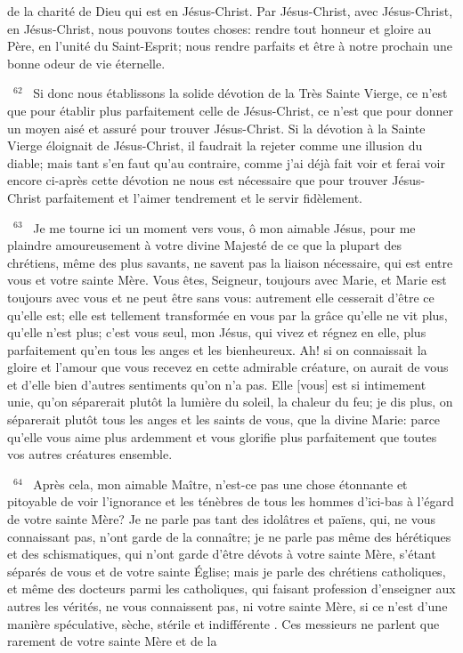 \documentclass[paper=a5,pagesize=pdftex,fontsize=15pt,headinclude=on,twoside=off]{scrbook}
\newcommand{\negphantom}[1]{\settowidth{\dimen0}{#1}\hspace*{-\dimen0}}
\newcommand{\versenb}[1]{\par \vspace{10pt}~\negphantom{~${}^{#1}$~}${}^{#1}$~}
\begin{document}
de la charité de Dieu qui est en Jésus-Christ. Par Jésus-Christ, avec Jésus-Christ, en Jésus-Christ, nous pouvons
toutes choses: rendre tout honneur et gloire au Père, en l'unité du Saint-Esprit; nous rendre parfaits et être à notre
prochain une bonne odeur de vie éternelle.
\versenb{62} Si donc nous établissons la solide dévotion de la Très Sainte Vierge, ce n'est que pour établir plus
parfaitement celle de Jésus-Christ, ce n'est que pour donner un moyen aisé et assuré pour trouver Jésus-Christ. Si
la dévotion à la Sainte Vierge éloignait de Jésus-Christ, il faudrait la rejeter comme une illusion du diable; mais tant
s'en faut qu'au contraire, comme j'ai déjà fait voir et ferai voir encore ci-après cette dévotion ne nous est
nécessaire que pour trouver Jésus-Christ parfaitement et l'aimer tendrement et le servir fidèlement.
\versenb{63} Je me tourne ici un moment vers vous, ô mon aimable Jésus, pour me plaindre amoureusement à votre divine
Majesté de ce que la plupart des chrétiens, même des plus savants, ne savent pas la liaison nécessaire, qui est
entre vous et votre sainte Mère. Vous êtes, Seigneur, toujours avec Marie, et Marie est toujours avec vous et ne
peut être sans vous: autrement elle cesserait d'être ce qu'elle est; elle est tellement transformée en vous par la
grâce qu'elle ne vit plus, qu'elle n'est plus; c'est vous seul, mon Jésus, qui vivez et régnez en elle, plus
parfaitement qu'en tous les anges et les bienheureux. Ah! si on connaissait la gloire et l'amour que vous recevez
en cette admirable créature, on aurait de vous et d'elle bien d'autres sentiments qu'on n'a pas. Elle [vous] est si
intimement unie, qu'on séparerait plutôt la lumière du soleil, la chaleur du feu; je dis plus, on séparerait plutôt tous
les anges et les saints de vous, que la divine Marie: parce qu'elle vous aime plus ardemment et vous glorifie plus
parfaitement que toutes vos autres créatures ensemble.
\versenb{64} Après cela, mon aimable Maître, n'est-ce pas une chose étonnante et pitoyable de voir l'ignorance et les
ténèbres de tous les hommes d'ici-bas à l'égard de votre sainte Mère? Je ne parle pas tant des idolâtres et païens,
qui, ne vous connaissant pas, n'ont garde de la connaître; je ne parle pas même des hérétiques et des
schismatiques, qui n'ont garde d'être dévots à votre sainte Mère, s'étant séparés de vous et de votre sainte Église;
mais je parle des chrétiens catholiques, et même des docteurs parmi les catholiques, qui faisant profession
d'enseigner aux autres les vérités, ne vous connaissent pas, ni votre sainte Mère, si ce n'est d'une manière
spéculative, sèche, stérile et indifférente . Ces messieurs ne parlent que rarement de votre sainte Mère et de la
\end{document}
